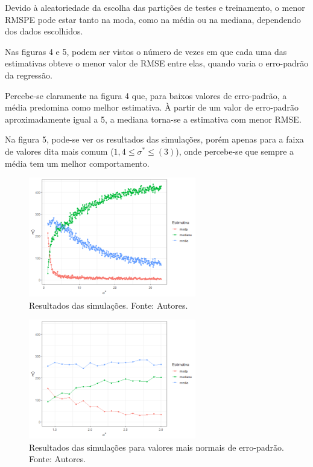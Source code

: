 \documentclass[a4paper, 12pt]{article}
\begin{document}
Devido à aleatoriedade da escolha das partições de testes e treinamento,
o menor RMSPE pode estar tanto na moda, como na média ou na mediana,
dependendo dos dados escolhidos.

Nas figuras 4 e 5, podem ser vistos o número de vezes em que cada uma
das estimativas obteve o menor valor de RMSE entre elas, quando varia o
erro-padrão da regressão.

Percebe-se claramente na figura 4 que, para baixos valores de
erro-padrão, a média predomina como melhor estimativa. À partir de um
valor de erro-padrão aproximadamente igual a 5, a mediana torna-se a
estimativa com menor RMSE.

Na figura 5, pode-se ver os resultados das simulações, porém apenas para
a faixa de valores dita mais comum (\(1,4 \leq \sigma^* \leq(3)\)), onde
percebe-se que sempre a média tem um melhor comportamento.

\begin{figure}
\centering
\includegraphics[width=0.65000\textwidth]{Impacto_sigma_files/figure-html/simulacoes.png}
\caption{Resultados das simulações. Fonte: Autores.}
\end{figure}

\begin{figure}
\centering
\includegraphics[width=0.65000\textwidth]{Impacto_sigma_files/figure-html/simulacoes_1.png}
\caption{Resultados das simulações para valores mais normais de
erro-padrão. Fonte: Autores.}
\end{figure}
\end{document}

